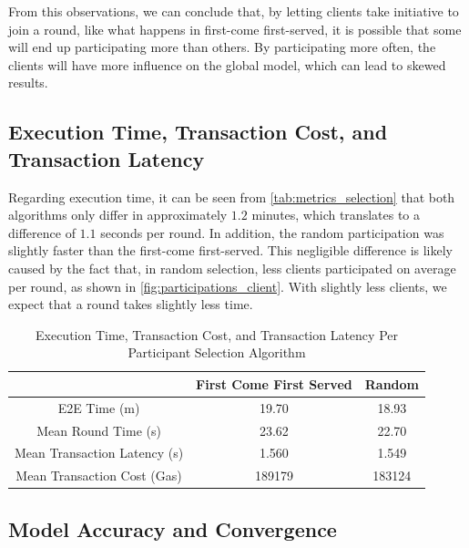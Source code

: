 From this observations, we can conclude that, by letting clients take initiative to join a round, like what happens in first-come first-served, it is possible that some will end up participating more than others. By participating more often, the clients will have more influence on the global model, which can lead to skewed results.

\subsection{Execution Time, Transaction Cost, and Transaction Latency}

Regarding execution time, it can be seen from  \autoref{tab:metrics_selection} that both algorithms only differ in approximately $1.2$ minutes, which translates to a difference of $1.1$ seconds per round. In addition, the random participation was slightly faster than the first-come first-served. This negligible difference is likely caused by the fact that, in random selection, less clients participated on average per round, as shown in \autoref{fig:participations_client}. With slightly less clients, we expect that a round takes slightly less time.

\begin{table}[!ht]
\begin{tabular}{c|c|c} \hline \hline
                              & First Come First Served & Random \\ \hline \hline
E2E Time (m)                   & 19.70                   & 18.93  \\ \hline
Mean Round Time (s)            & 23.62                   & 22.70  \\ \hline
Mean Transaction Latency (s)   & 1.560                   & 1.549  \\ \hline
Mean Transaction Cost (Gas)    & 189179                  & 183124 \\ \hline
\end{tabular}
\caption{Execution Time, Transaction Cost, and Transaction Latency Per Participant Selection Algorithm}
\label{tab:metrics_selection}
\end{table}

\subsection{Model Accuracy and Convergence}

